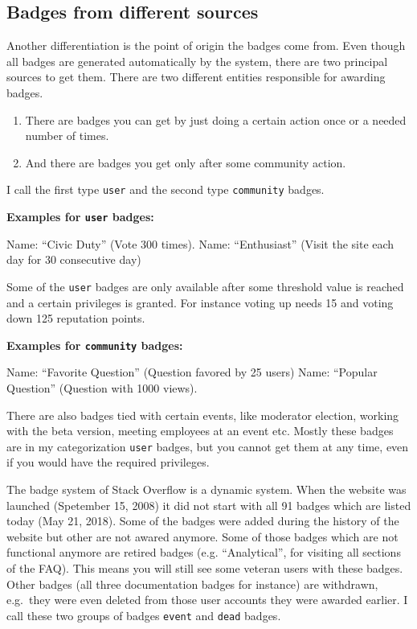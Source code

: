 \documentclass[]{book}
\providecommand{\tightlist}{%
  \setlength{\itemsep}{0pt}\setlength{\parskip}{0pt}}
\theoremstyle{definition}
\theoremstyle{definition}
\theoremstyle{definition}
\theoremstyle{remark}
\begin{document}
\subsection{Badges from different
sources}\label{badges-from-different-sources}

Another differentiation is the point of origin the badges come from.
Even though all badges are generated automatically by the system, there
are two principal sources to get them. There are two different entities
responsible for awarding badges.

\begin{enumerate}
\def\labelenumi{\arabic{enumi}.}
\tightlist
\item
  There are badges you can get by just doing a certain action once or a
  needed number of times.
\item
  And there are badges you get only after some community action.
\end{enumerate}

I call the first type \texttt{user} and the second type
\texttt{community} badges.

\textbf{Examples for \texttt{user} badges:}

Name: ``Civic Duty'' (Vote 300 times). Name: ``Enthusiast'' (Visit the
site each day for 30 consecutive day)

Some of the \texttt{user} badges are only available after some threshold
value is reached and a certain privileges is granted. For instance
voting up needs 15 and voting down 125 reputation points.

\textbf{Examples for \texttt{community} badges:}

Name: ``Favorite Question'' (Question favored by 25 users) Name:
``Popular Question'' (Question with 1000 views).

There are also badges tied with certain events, like moderator election,
working with the beta version, meeting employees at an event etc. Mostly
these badges are in my categorization \texttt{user} badges, but you
cannot get them at any time, even if you would have the required
privileges.

The badge system of Stack Overflow is a dynamic system. When the website
was launched (Spetember 15, 2008) it did not start with all 91 badges
which are listed today (May 21, 2018). Some of the badges were added
during the history of the website but other are not awared anymore. Some
of those badges which are not functional anymore are retired badges
(e.g. ``Analytical'', for visiting all sections of the FAQ). This means
you will still see some veteran users with these badges. Other badges
(all three documentation badges for instance) are withdrawn, e.g.~they
were even deleted from those user accounts they were awarded earlier. I
call these two groups of badges \texttt{event} and \texttt{dead} badges.
\end{document}
